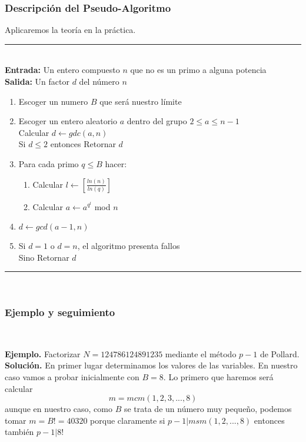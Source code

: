 \documentclass[11pt, conference]{IEEEtran}
\begin{document}
\pagebreak

\subsubsection[Descripción del Pseudo-Algoritmo]{\textbf{Descripción del Pseudo-Algoritmo}}
Aplicaremos la teoría en la práctica.\\ 
\rule[0mm]{181mm}{0.1mm}\\
\textbf{Entrada:} Un entero compuesto $n$ que no es un primo a alguna potencia\\
\textbf{Salida:} Un factor $d$ del número $n$
\begin{enumerate}
	\item Escoger un numero $B$ que será nuestro límite
	\item Escoger un entero aleatorio $a$ dentro del grupo $2\leq a \leq n-1$\\
	Calcular $d\leftarrow gdc(a,n)$\\
	Si $d\leq2$ entonces Retornar $d$
	\item Para cada primo $q \leq B$ hacer:
	\begin{enumerate}
		\item Calcular $l \leftarrow \left[\frac{ln(n)}{ln(q)}\right]$
		\item Calcular $a\leftarrow a^{q^{l}}$ mod $n$
	\end{enumerate}
	\item $d \leftarrow gcd(a-1,n)$
	\item Si $d=1$ o $d=n$, el algoritmo presenta fallos\\
	Sino Retornar $d$
\end{enumerate}
\rule[3mm]{181mm}{0.1mm}

\

\subsubsection[Ejemplo y seguimiento]{\textbf{Ejemplo y seguimiento}}

\

\textbf{Ejemplo.} Factorizar $N = 124786124891235$ mediante el método $p-1$ de Pollard.\\
\textbf{Solución.} En primer lugar determinamos los valores de las variables. En nuestro caso vamos a probar inicialmente con $B=8$. Lo primero que haremos será calcular
\[
	m= mcm(1,2,3,...,8)
\]
aunque en nuestro caso, como $B$ se trata de un número muy pequeño, podemos tomar $m = B! =  40320$ porque claramente si $p-1|msm(1,2,...,8)$ entonces también $p-1|8!$\\
\end{document}
